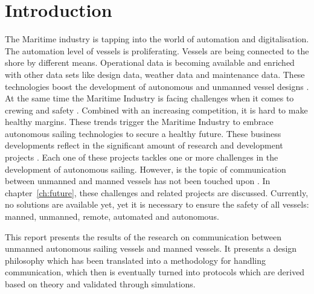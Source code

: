 \chapter*{Introduction}
\label{sec:introduction}

The Maritime industry is tapping into the world of automation and digitalisation. The automation level of vessels is proliferating. Vessels are being connected to the shore by different means. Operational data is becoming available and enriched with other data sets like design data, weather data and maintenance data. These technologies boost the development of autonomous and unmanned vessel designs \cite{Blanke2017}. 
At the same time the Maritime Industry is facing challenges when it comes to crewing and safety \cite{Cappelle2018}. Combined with an increasing competition, it is hard to make healthy margins. These trends trigger the Maritime Industry to embrace autonomous sailing technologies to secure a healthy future. These business developments reflect in the significant amount of research and development projects \cite{SMASH2017} \cite{Eriksen2017} \cite{MUNIN2016} \cite{Sames2017} \cite{RollsRoyce2015} \cite{Waterborne2016}. Each one of these projects tackles one or more challenges in the development of autonomous sailing. However, is the topic of communication between unmanned and manned vessels has not been touched upon \cite{Saarni2018}. In chapter~\ref{ch:future}, these challenges and related projects are discussed. Currently, no solutions are available yet, yet it is necessary to ensure the safety of all vessels: manned, unmanned, remote, automated and autonomous.

This report presents the results of the research on communication between unmanned autonomous sailing vessels and manned vessels. It presents a design philosophy which has been translated into a methodology for handling communication, which then is eventually turned into protocols which are derived based on theory and validated through simulations.


